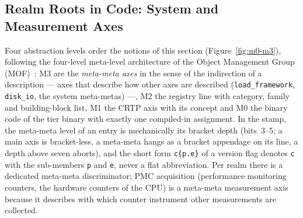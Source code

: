 \begin{nurkurz}
\section{Realm Roots in Code: System and Measurement Axes}\label{sec:impl-system-axes}
Four abstraction levels order the notions of this section (Figure~\ref{fig:m0-m3}), following the
four-level meta-level architecture of the Object Management Group (MOF)~\cite{omg2016mof}: M3 are the
\emph{meta-meta axes} in the sense of the indirection of a description --- axes that describe how other
axes are described (\texttt{load\_framework}, \texttt{disk\_io}, the system meta-metas) ---, M2 the
registry line with category, family and building-block list, M1 the CRTP axis with its concept and M0
the binary code of the tier binary with exactly one compiled-in assignment. In the stamp, the meta-meta
level of an entry is mechanically its bracket depth (bits~3--5; a main axis is bracket-less, a
meta-meta hangs as a bracket appendage on its line, a depth above seven aborts), and the short form
\texttt{c\{p.e\}} of a version flag denotes \texttt{c} with the sub-members \texttt{p} and \texttt{e},
never a flat abbreviation. Per realm there is a dedicated meta-meta discriminator; PMC acquisition
(performance monitoring counters, the hardware counters of the CPU) is a meta-meta measurement axis
because it describes with which counter instrument other measurements are collected.
\begin{figure}[htbp]\centering
{}
\end{figure}
\end{nurkurz}
